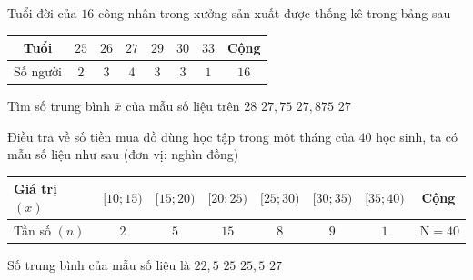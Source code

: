 \begin{ex}%
	Tuổi đời của $16$ công nhân trong xưởng  sản xuất được thống kê trong bảng sau
	\begin{center}
		\begin{tabular}{|c|c|c|c|c|c|c|c|}
			 \hline Tuổi & $25$ & $26$ & $27$ & $29$ & $30$ & $33$ & Cộng\\
			\hline Số người & $2$ &  $3$ & $4$ & $3$ & $3$ & $1$ & $16$\\
			 \hline
		\end{tabular}
	\end{center}
	Tìm số trung bình  $\overline {x}$ của mẫu số liệu trên
	\choice 
		{$28$} 
		 {$27{,}75$}
		{\True  $27{,}875$}
		 {$27$}
\end{ex}

\begin{ex}%
	Điều tra về  số tiền mua đồ dùng học tập trong một tháng của $40$ học sinh, ta có mẫu số liệu như sau (đơn vị: nghìn đồng)
	\begin{center}
		\begin{tabular}{|l|c|c|c|c|c|c|c|}
			\hline Giá trị  $(x)$ & {$[10; 15)$} & {$[15; 20)$} & {$[20; 25)$} & {$[25; 30)$} & {$[30; 35)$} & {$[35; 40)$} & Cộng\\
			\hline Tần số $(n)$ & $2$ & $5$ & $15$ &  $8$ & $9$ & $1$ & $\mathrm{~N}=40$\\
			 \hline
		\end{tabular}
	\end{center}
	Số trung bình của mẫu số liệu là 
	\choice 
		 {$22{,}5$}
		 {\True $25$}
		{$25{,}5$} 
		 {$27$}
\end{ex}

